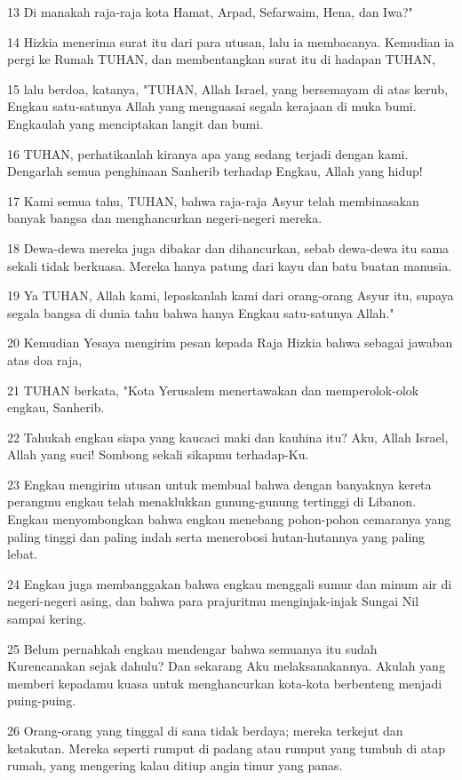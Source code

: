 \par 13 Di manakah raja-raja kota Hamat, Arpad, Sefarwaim, Hena, dan Iwa?"
\par 14 Hizkia menerima surat itu dari para utusan, lalu ia membacanya. Kemudian ia pergi ke Rumah TUHAN, dan membentangkan surat itu di hadapan TUHAN,
\par 15 lalu berdoa, katanya, "TUHAN, Allah Israel, yang bersemayam di atas kerub, Engkau satu-satunya Allah yang menguasai segala kerajaan di muka bumi. Engkaulah yang menciptakan langit dan bumi.
\par 16 TUHAN, perhatikanlah kiranya apa yang sedang terjadi dengan kami. Dengarlah semua penghinaan Sanherib terhadap Engkau, Allah yang hidup!
\par 17 Kami semua tahu, TUHAN, bahwa raja-raja Asyur telah membinasakan banyak bangsa dan menghancurkan negeri-negeri mereka.
\par 18 Dewa-dewa mereka juga dibakar dan dihancurkan, sebab dewa-dewa itu sama sekali tidak berkuasa. Mereka hanya patung dari kayu dan batu buatan manusia.
\par 19 Ya TUHAN, Allah kami, lepaskanlah kami dari orang-orang Asyur itu, supaya segala bangsa di dunia tahu bahwa hanya Engkau satu-satunya Allah."
\par 20 Kemudian Yesaya mengirim pesan kepada Raja Hizkia bahwa sebagai jawaban atas doa raja,
\par 21 TUHAN berkata, "Kota Yerusalem menertawakan dan memperolok-olok engkau, Sanherib.
\par 22 Tahukah engkau siapa yang kaucaci maki dan kauhina itu? Aku, Allah Israel, Allah yang suci! Sombong sekali sikapmu terhadap-Ku.
\par 23 Engkau mengirim utusan untuk membual bahwa dengan banyaknya kereta perangmu engkau telah menaklukkan gunung-gunung tertinggi di Libanon. Engkau menyombongkan bahwa engkau menebang pohon-pohon cemaranya yang paling tinggi dan paling indah serta menerobosi hutan-hutannya yang paling lebat.
\par 24 Engkau juga membanggakan bahwa engkau menggali sumur dan minum air di negeri-negeri asing, dan bahwa para prajuritmu menginjak-injak Sungai Nil sampai kering.
\par 25 Belum pernahkah engkau mendengar bahwa semuanya itu sudah Kurencanakan sejak dahulu? Dan sekarang Aku melaksanakannya. Akulah yang memberi kepadamu kuasa untuk menghancurkan kota-kota berbenteng menjadi puing-puing.
\par 26 Orang-orang yang tinggal di sana tidak berdaya; mereka terkejut dan ketakutan. Mereka seperti rumput di padang atau rumput yang tumbuh di atap rumah, yang mengering kalau ditiup angin timur yang panas.

